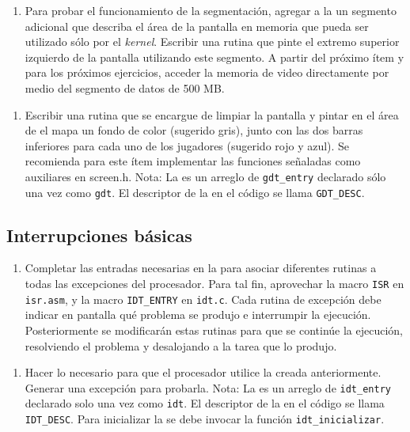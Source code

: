     \begin{enumerate}[resume,label=(\alph*)]
      \item Para probar el funcionamiento de la segmentación, agregar a la  un segmento adicional que describa el área de la pantalla en memoria que pueda ser utilizado sólo por el \emph{kernel}. Escribir una rutina que pinte el extremo superior izquierdo de la pantalla utilizando este segmento. A partir del próximo ítem y para los próximos ejercicios, acceder la memoria de video directamente por medio del segmento de datos de 500 MB.
    \end{enumerate}
   
    \begin{enumerate}[resume,label=(\alph*)]
      \item Escribir una rutina que se encargue de limpiar la pantalla y pintar en el área de el mapa un fondo de color (sugerido gris), junto con las dos barras inferiores para cada uno de los jugadores (sugerido rojo y azul). Se recomienda para este ítem implementar las funciones señaladas como auxiliares en screen.h.
      Nota: La  es un arreglo de \texttt{gdt\_entry} declarado sólo una vez como \texttt{gdt}. El descriptor de la  en el código se llama \texttt{GDT\_DESC}.
    \end{enumerate}

  
  \subsection{Interrupciones básicas}
    \begin{enumerate}[label=(\alph*)]
      \item Completar las entradas necesarias en la  para asociar diferentes rutinas a todas las excepciones del procesador. Para tal fin, aprovechar la macro \texttt{ISR} en \texttt{isr.asm}, y la macro \texttt{IDT\_ENTRY} en \texttt{idt.c}. Cada rutina de excepción debe indicar en pantalla qué problema se produjo e interrumpir la ejecución. Posteriormente se modificarán estas rutinas para que se continúe la ejecución, resolviendo el problema y desalojando a la tarea que lo produjo.
    \end{enumerate}

    \begin{enumerate}[resume,label=(\alph*)]
      \item Hacer lo necesario para que el procesador utilice la  creada anteriormente. Generar una excepción para probarla.
      Nota: La  es un arreglo de \texttt{idt\_entry} declarado solo una vez como \texttt{idt}. El descriptor de la  en el código se llama \texttt{IDT\_DESC}. Para inicializar la  se debe invocar la función \texttt{idt\_inicializar}.
    \end{enumerate}
  
